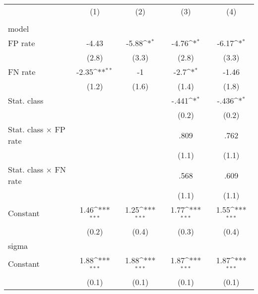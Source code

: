 {
\def\sym#1{\ifmmode^{#1}\else\(^{#1}\)\fi}
\begin{tabular}{l*{4}{c}}
\hline\hline
                &\multicolumn{1}{c}{(1)}&\multicolumn{1}{c}{(2)}&\multicolumn{1}{c}{(3)}&\multicolumn{1}{c}{(4)}\\
                &\multicolumn{1}{c}{}&\multicolumn{1}{c}{}&\multicolumn{1}{c}{}&\multicolumn{1}{c}{}\\
\hline
model           &                  &                  &                  &                  \\
FP rate         &    -4.43         &    -5.88\sym{*}  &    -4.76\sym{*}  &    -6.17\sym{*}  \\
                &    (2.8)         &    (3.3)         &    (2.8)         &    (3.3)         \\
FN rate         &    -2.35\sym{**} &       -1         &     -2.7\sym{*}  &    -1.46         \\
                &    (1.2)         &    (1.6)         &    (1.4)         &    (1.8)         \\
Stat. class     &                  &                  &    -.441\sym{*}  &    -.436\sym{*}  \\
                &                  &                  &    (0.2)         &    (0.2)         \\
Stat. class $\times$ FP rate&                  &                  &     .809         &     .762         \\
                &                  &                  &    (1.1)         &    (1.1)         \\
Stat. class $\times$ FN rate&                  &                  &     .568         &     .609         \\
                &                  &                  &    (1.1)         &    (1.1)         \\
Constant        &     1.46\sym{***}&     1.25\sym{***}&     1.77\sym{***}&     1.55\sym{***}\\
                &    (0.2)         &    (0.4)         &    (0.3)         &    (0.4)         \\
\hline
sigma           &                  &                  &                  &                  \\
Constant        &     1.88\sym{***}&     1.88\sym{***}&     1.87\sym{***}&     1.87\sym{***}\\
                &    (0.1)         &    (0.1)         &    (0.1)         &    (0.1)         \\

\end{tabular}}
